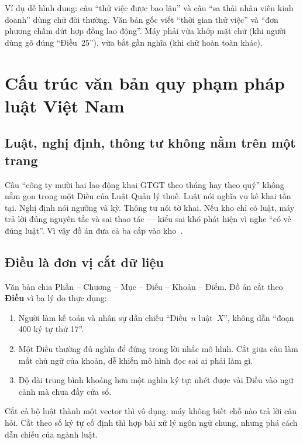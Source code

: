Ví dụ dễ hình dung: câu ``thử việc được bao lâu'' và câu ``sa thải nhân viên
kinh doanh'' dùng chữ đời thường. Văn bản gốc viết ``thời gian thử việc'' và
``đơn phương chấm dứt hợp đồng lao động''. Máy phải vừa khớp mặt chữ (khi người
dùng gõ đúng ``Điều~25''), vừa bắt gần nghĩa (khi chữ hoàn toàn khác).



\section{Cấu trúc văn bản quy phạm pháp luật Việt Nam}

\subsection{Luật, nghị định, thông tư không nằm trên một trang}

Câu ``công ty mười hai lao động khai GTGT theo tháng hay theo quý'' không nằm
gọn trong một Điều của Luật Quản lý thuế. Luật nói nghĩa vụ kê khai tồn tại.
Nghị định nói ngưỡng và kỳ. Thông tư nói tờ khai. Nếu kho chỉ có luật, máy trả
lời đúng nguyên tắc và sai thao tác --- kiểu sai khó phát hiện vì nghe ``có vẻ
đúng luật''. Vì vậy đồ án đưa cả ba cấp vào kho~\cite{qlthue2019, quochoi2017,
bll2019}.

\subsection{Điều là đơn vị cắt dữ liệu}

Văn bản chia Phần -- Chương -- Mục -- Điều -- Khoản -- Điểm. Đồ án cắt theo
\textbf{Điều} vì ba lý do thực dụng:

\begin{enumerate}
    \item Người làm kế toán và nhân sự dẫn chiếu ``Điều~$n$ luật~$X$'', không
    dẫn ``đoạn 400 ký tự thứ 17''.
    \item Một Điều thường đủ nghĩa để đứng trong lời nhắc mô hình. Cắt giữa câu
    làm mất chủ ngữ của khoản, dễ khiến mô hình đọc sai ai phải làm gì.
    \item Độ dài trung bình khoảng hơn một nghìn ký tự: nhét được vài Điều vào
    ngữ cảnh mà chưa đầy cửa sổ.
\end{enumerate}

Cắt cả bộ luật thành một vector thì vô dụng: máy không biết chỗ nào trả lời câu
hỏi. Cắt theo số ký tự cố định thì hợp bài xử lý ngôn ngữ chung, nhưng phá cách
dẫn chiếu của ngành luật.

